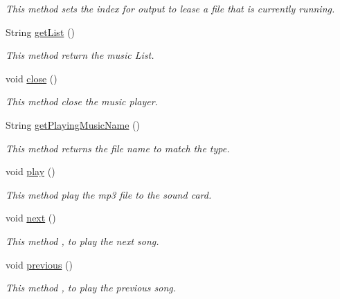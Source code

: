 \begin{DoxyCompactItemize}
\begin{DoxyCompactList}\small\item\em This method sets the index for output to lease a file that is currently running. \end{DoxyCompactList}\item 
String \hyperlink{classkr_1_1ac_1_1kookmin_1_1cs_1_1music_1_1_music_player_a333e46066801be56774f5c00b433afea}{get\+List} ()
\begin{DoxyCompactList}\small\item\em This method return the music List. \end{DoxyCompactList}\item 
void \hyperlink{classkr_1_1ac_1_1kookmin_1_1cs_1_1music_1_1_music_player_a2395b02bb068e9cd83ed436b659e011c}{close} ()
\begin{DoxyCompactList}\small\item\em This method close the music player. \end{DoxyCompactList}\item 
String \hyperlink{classkr_1_1ac_1_1kookmin_1_1cs_1_1music_1_1_music_player_a2663e337f13310d1fb0f51fe66d69711}{get\+Playing\+Music\+Name} ()
\begin{DoxyCompactList}\small\item\em This method returns the file name to match the type. \end{DoxyCompactList}\item 
void \hyperlink{classkr_1_1ac_1_1kookmin_1_1cs_1_1music_1_1_music_player_ac1a3d2cb3bfa953b28cf03806fed0499}{play} ()
\begin{DoxyCompactList}\small\item\em This method play the mp3 file to the sound card. \end{DoxyCompactList}\item 
void \hyperlink{classkr_1_1ac_1_1kookmin_1_1cs_1_1music_1_1_music_player_a909399c619c52785970eeed2e87e1f18}{next} ()
\begin{DoxyCompactList}\small\item\em This method , to play the next song. \end{DoxyCompactList}\item 
void \hyperlink{classkr_1_1ac_1_1kookmin_1_1cs_1_1music_1_1_music_player_a2b1956b10fac3122dcfb3f0dfc8b0be2}{previous} ()
\begin{DoxyCompactList}\small\item\em This method , to play the previous song. \end{DoxyCompactList}\item 

\end{DoxyCompactItemize}
